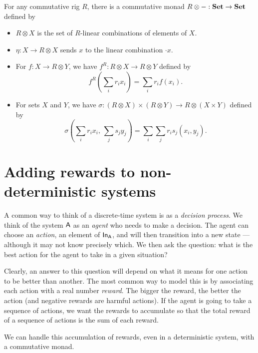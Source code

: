 \documentclass[DynamicalBook]{subfiles}
\begin{document}
\begin{proposition}
  For any commutative rig $R$, there is a commutative monad $R \otimes - :
  \textbf{Set} \to \textbf{Set}$ defined by
  \begin{itemize}
    \item $R \otimes X$ is the set of $R$-linear combinations of elements of
      $X$.
    \item $\eta : X \to R \otimes X$ sends $x$ to the linear combination $
      \cdot x$.
    \item For $f : X \to R \otimes Y$, we have $f^{R} : R \otimes X \to R
      \otimes Y$ defined by
      \[
f^R\left( \sum_{i}r_i x_i \right) = \sum_{i} r_i f(x_i).
\]
    \item For sets $X$ and $Y$, we have $\sigma : (R \otimes X) \times (R
      \otimes Y) \to R \otimes (X \times Y)$ defined by
      \[
\sigma\left( \sum_i r_i x_i,\, \sum_j s_j y_j \right) = \sum_{i}\sum_{j} r_i s_j
(x_i, y_j).
      \]
  \end{itemize}
\end{proposition}


\section{Adding rewards to non-deterministic systems}

A common way to think of a discrete-time system is as a \emph{decision process}. We
think of the system $\mathsf{A}$ as an \emph{agent} who needs to make a decision.
The agent can choose an \emph{action}, an element of $\mathsf{In}_{\mathsf{A}}$, and will then
transition into a new state --- although it may not know precisely which. We
then ask the question: what is the best action for the agent to take in a given
situation?

Clearly, an answer to this question will depend on what it means for one action
to be better than another. The most common way to model this is by associating
each action with a real number \emph{reward}. The bigger the reward, the better
the action (and negative rewards are harmful actions). If the agent is going to
take a sequence of actions, we want the rewards to accumulate so that the total
reward of a sequence of actions is the sum of each reward.

We can handle this accumulation of rewards, even in a deterministic system, with
a commutative monad.
\end{document}
